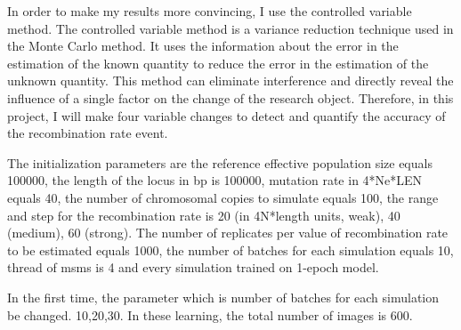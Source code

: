 \documentclass[11pt,a4 paper,title page]{article}
\begin{document}
In order to make my results more convincing, I use the controlled variable method. The controlled variable method is a variance reduction technique used in the Monte Carlo method. It uses the information about the error in the estimation of the known quantity to reduce the error in the estimation of the unknown quantity. This method can eliminate interference and directly reveal the influence of a single factor on the change of the research object. Therefore, in this project, I will make four variable changes to detect and quantify the accuracy of the recombination rate event.
\hfill\break

The initialization parameters are the reference effective population size equals 100000, the length of the locus in bp is 100000, mutation rate in 4*Ne*LEN equals 40, the number of chromosomal copies to simulate equals 100, the range and step for the recombination rate is 20 (in 4N*length units, weak), 40 (medium), 60 (strong). The number of replicates per value of recombination rate to be estimated equals 1000, the number of batches for each simulation equals 10, thread of msms is 4 and every simulation trained on 1-epoch model.
\hfill\break

In the first time, the parameter which is number of batches for each simulation be changed. 10,20,30. In these learning, the total number of images is 600.
\hfill\break 
\end{document}

